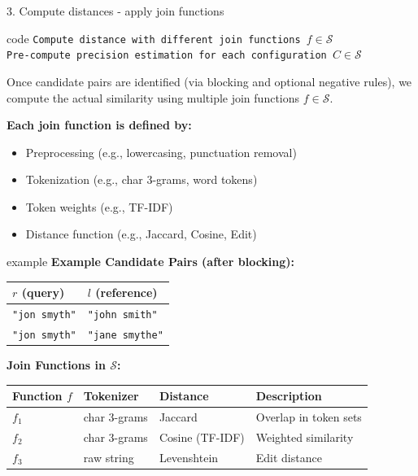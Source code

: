 \documentclass[8pt]{beamer} %
\begin{document}
\begin{frame}{3. Compute distances - apply join functions}
	
	\begin{beamercolorbox}[rounded=true, shadow=true, leftskip=1em, rightskip=1em]{code}
	\texttt{Compute distance with different join functions $f \in \mathcal{S}$}\\
	\texttt{Pre-compute precision estimation for each configuration $C \in \mathcal{S}$}
	\end{beamercolorbox}
	
	\vspace{0.5em}
	Once candidate pairs are identified (via blocking and optional negative rules), we compute the actual similarity using multiple join functions $f \in \mathcal{S}$.
	
	\vspace{0.5em}
	\textbf{Each join function is defined by:}
	\begin{itemize}
		\item Preprocessing (e.g., lowercasing, punctuation removal)
		\item Tokenization (e.g., char 3-grams, word tokens)
		\item Token weights (e.g., TF-IDF)
		\item Distance function (e.g., Jaccard, Cosine, Edit)
	\end{itemize}
	
	\vspace{0.5em}
	\begin{beamercolorbox}[rounded=true, shadow=true, leftskip=1em, rightskip=1em]{example}
		\textbf{Example Candidate Pairs (after blocking):}
		\begin{tabular}{ll}
			$r$ (query) & $l$ (reference) \\
			\hline
			\texttt{"jon smyth"} & \texttt{"john smith"} \\
			\texttt{"jon smyth"} & \texttt{"jane smythe"} \\
		\end{tabular}
		
		\vspace{0.5em}
		\textbf{Join Functions in $\mathcal{S}$:}
		\begin{tabular}{llll}
			\textbf{Function $f$} & \textbf{Tokenizer} & \textbf{Distance} & \textbf{Description} \\
			\hline
			$f_1$ & char 3-grams & Jaccard & Overlap in token sets \\
			$f_2$ & char 3-grams & Cosine (TF-IDF) & Weighted similarity \\
			$f_3$ & raw string   & Levenshtein & Edit distance \\
		\end{tabular}
		

\end{beamercolorbox}
\end{frame}
\end{document}
